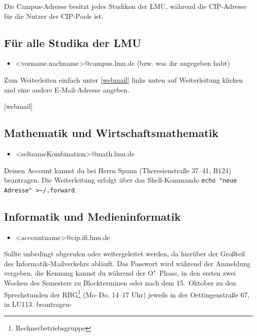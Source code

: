 Die Campus-Adresse besitzt jedes Studikon der LMU, während die CIP-Adresse für die Nutzer der CIP-Pools ist.

\subsection*{Für alle Studika der LMU}
\begin{itemize}
	\item[]<vorname.nachname>@campus.lmu.de (bzw. was ihr angegeben habt)
\end{itemize}
Zum Weiterleiten einfach unter \ref{webmail} links unten auf Weiterleitung klicken und eine andere E-Mail-Adresse angeben.

\begin{urlList}
	[webmail]
\end{urlList}

\subsection*{Mathematik und Wirtschaftsmathematik\subjectList{\subjectM\subjectW}}
\begin{itemize}
	\item[]<seltsameKombination>@math.lmu.de
\end{itemize}
Deinen Account kannst du bei Herrn Spann (Theresienstraße 37--41, B124) beantragen. Die Weiterleitung erfolgt über das Shell-Kommando \verb|echo "neue Adresse" >~/.forward|. 

\subsection*{Informatik und Medieninformatik \subjectList{\subjectI\subjectMI}}
\begin{itemize}
	\item[]<accountname>@cip.ifi.lmu.de
\end{itemize}
Sollte unbedingt abgerufen oder weitergeleitet werden, da hierüber der Großteil des Informatik-Mailverkehrs abläuft. Das Passwort wird während der Anmeldung vergeben, die Kennung kannst du während der O"~Phase, in den ersten zwei Wochen des Semesters zu Blockterminen oder nach dem 15.\ Oktober zu den Sprechstunden der RBG\footnote{Rechnerbetriebsgruppe} 
(Mo--Do, 14--17 Uhr) jeweils in der Oettingenstraße 67, in LU113. beantragen-

\begin{urlList}
\end{urlList}

